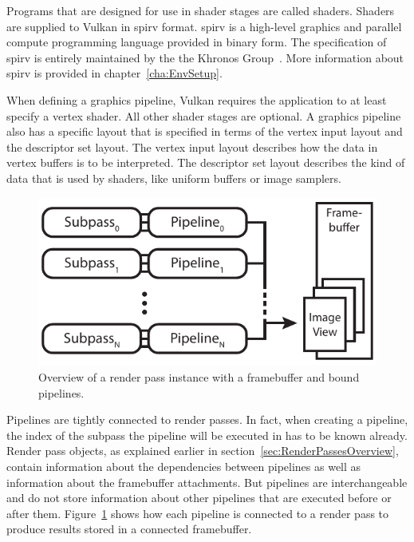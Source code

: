     Programs that are designed for use in shader stages are called shaders.
    Shaders are supplied to Vulkan in \gls{spirv} format.
    \gls{spirv} is a high-level graphics and parallel compute programming language provided in binary form.
    The specification of \gls{spirv} is entirely maintained by the the Khronos Group~\cite{spirvspecprov}.
    More information about \gls{spirv} is provided in chapter~\ref{cha:EnvSetup}.

    When defining a graphics pipeline, Vulkan requires the application to at least specify a vertex shader.
    All other shader stages are optional.
    A graphics pipeline also has a specific layout that is specified in terms of the vertex input layout and the descriptor set layout.
    The vertex input layout describes how the data in vertex buffers is to be interpreted.
    The descriptor set layout describes the kind of data that is used by shaders, like uniform buffers or image samplers.


    \begin{figure}
      \centering
      \includegraphics[width=\textwidth]{Main/Images/RenderPassInstanceSample}
      \caption{Overview of a render pass instance with a framebuffer and bound pipelines.}
      \label{fig:RenderPassInstanceSample}
    \end{figure}

    Pipelines are tightly connected to render passes.
    In fact, when creating a pipeline, the index of the subpass the pipeline will be executed in has to be known already.
    Render pass objects, as explained earlier in section~\ref{sec:RenderPassesOverview}, contain information about the dependencies between pipelines as well as information about the framebuffer attachments.
    But pipelines are interchangeable and do not store information about other pipelines that are executed before or after them.
    Figure~\ref{fig:RenderPassInstanceSample} shows how each pipeline is connected to a render pass to produce results stored in a connected framebuffer.

